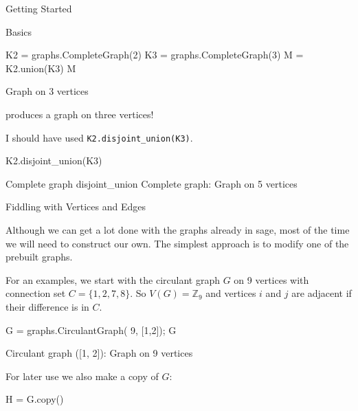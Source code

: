 \begin{chap}{Getting Started}
\begin{sect}{Basics}
\begin{sagecode}
\begin{sageinput}
K2 = graphs.CompleteGraph(2)
K3 = graphs.CompleteGraph(3)
M = K2.union(K3)
M
\end{sageinput}
\begin{sageoutput}
Graph on 3 vertices
\end{sageoutput}
\end{sagecode}
%
\begin{para}
produces a graph on three vertices!
\end{para}
%
\begin{para}
I should have used \verb|K2.disjoint_union(K3)|.
\end{para}
%
\begin{sagecode}
\begin{sageinput}
K2.disjoint_union(K3)
\end{sageinput}
\begin{sageoutput}
Complete graph disjoint_union Complete graph: Graph on 5 vertices
\end{sageoutput}
\end{sagecode}
%
\end{sect}
%
\begin{sect}{Fiddling with Vertices and Edges}
%
\begin{para}
Although we can get a lot done with the graphs already in sage, most of the time
we will need to construct our own. The simplest approach is to modify one of 
the prebuilt graphs.
\end{para}
%
\begin{para}
For an examples, we start with the circulant graph $G$ on 9 vertices
with connection set $C=\{1,2,7,8\}$. So $V(G)=\mathbb{Z}_9$ and
vertices $i$ and $j$ are adjacent if their difference is in $C$.
\end{para}
%
\begin{sagecode}
\begin{sageinput}
G = graphs.CirculantGraph( 9, [1,2]); G
\end{sageinput}
\begin{sageoutput}
Circulant graph ([1, 2]): Graph on 9 vertices
\end{sageoutput}
\end{sagecode}
%
\begin{para}
For later use we also make a copy of $G$:
\end{para}
%
\begin{sagecode}
\begin{sageinput}
H = G.copy()
\end{sageinput}

\end{sagecode}
\end{sect}
\end{chap}
